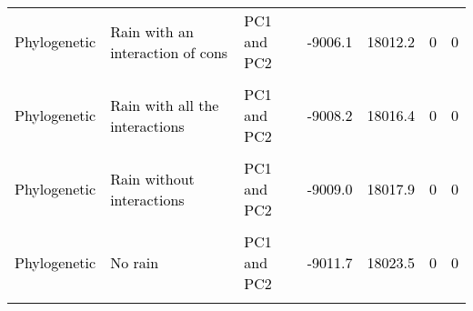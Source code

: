 \documentclass[
  12pt,
  letterpaper,
  DIV=11,
  numbers=noendperiod]{scrartcl}
\begin{document}
\begin{table}[H]
{\begin{tabular}[t]{lllllll}
\addlinespace
\textcolor{black}{Phylogenetic} & \textcolor{black}{Rain with an interaction of cons} & \textcolor{black}{PC1 and PC2} & \textcolor{black}{-9006.1} & \textcolor{black}{18012.2} & \textcolor{black}{0} & \textcolor{black}{0}\\
\cellcolor{gray!6}{\textcolor{black}{Non-phylogenetic}} & \cellcolor{gray!6}{\textcolor{black}{Rain with all the interactions}} & \cellcolor{gray!6}{\textcolor{black}{PC1 and PC2}} & \cellcolor{gray!6}{\textcolor{black}{-9007.1}} & \cellcolor{gray!6}{\textcolor{black}{18014.1}} & \cellcolor{gray!6}{\textcolor{black}{0}} & \cellcolor{gray!6}{\textcolor{black}{0}}\\
\textcolor{black}{Phylogenetic} & \textcolor{black}{Rain with all the interactions} & \textcolor{black}{PC1 and PC2} & \textcolor{black}{-9008.2} & \textcolor{black}{18016.4} & \textcolor{black}{0} & \textcolor{black}{0}\\
\cellcolor{gray!6}{\textcolor{black}{Non-phylogenetic}} & \cellcolor{gray!6}{\textcolor{black}{Rain without interactions}} & \cellcolor{gray!6}{\textcolor{black}{PC1 and PC2}} & \cellcolor{gray!6}{\textcolor{black}{-9008.4}} & \cellcolor{gray!6}{\textcolor{black}{18016.8}} & \cellcolor{gray!6}{\textcolor{black}{0}} & \cellcolor{gray!6}{\textcolor{black}{0}}\\
\textcolor{black}{Phylogenetic} & \textcolor{black}{Rain without interactions} & \textcolor{black}{PC1 and PC2} & \textcolor{black}{-9009.0} & \textcolor{black}{18017.9} & \textcolor{black}{0} & \textcolor{black}{0}\\
\addlinespace
\cellcolor{gray!6}{\textcolor{black}{Non-phylogenetic}} & \cellcolor{gray!6}{\textcolor{black}{No rain}} & \cellcolor{gray!6}{\textcolor{black}{PC1 and PC2}} & \cellcolor{gray!6}{\textcolor{black}{-9010.2}} & \cellcolor{gray!6}{\textcolor{black}{18020.3}} & \cellcolor{gray!6}{\textcolor{black}{0}} & \cellcolor{gray!6}{\textcolor{black}{0}}\\
\textcolor{black}{Phylogenetic} & \textcolor{black}{No rain} & \textcolor{black}{PC1 and PC2} & \textcolor{black}{-9011.7} & \textcolor{black}{18023.5} & \textcolor{black}{0} & \textcolor{black}{0}\\
\cellcolor{gray!6}{\textcolor{black}{Non-phylogenetic}} & \cellcolor{gray!6}{\textcolor{black}{Rain with an interaction of cons}} & \cellcolor{gray!6}{\textcolor{black}{All traits}} & \cellcolor{gray!6}{\textcolor{black}{-9024.1}} & \cellcolor{gray!6}{\textcolor{black}{18048.3}} & \cellcolor{gray!6}{\textcolor{black}{0}} & \cellcolor{gray!6}{\textcolor{black}{0}}\\

\end{tabular}}
\end{table}
\end{document}
